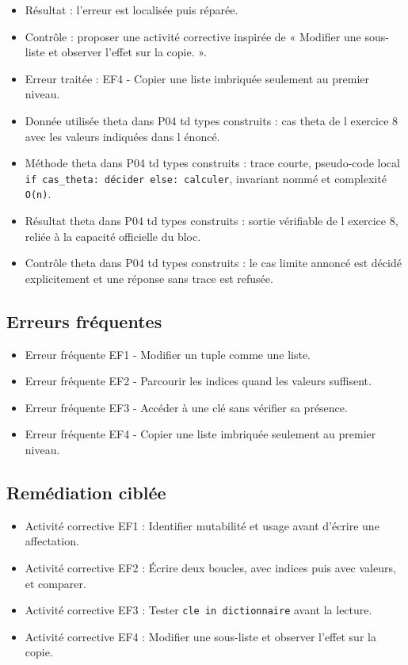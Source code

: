 \begin{itemize}
  Corrigé exercice 8
\item
  Résultat : l'erreur est localisée puis réparée.
\item
  Contrôle : proposer une activité corrective inspirée de « Modifier une
  sous-liste et observer l'effet sur la copie. ».
\item
  Erreur traitée : EF4 - Copier une liste imbriquée seulement au premier
  niveau.
\item
  Donnée utilisée theta dans P04 td types construits : cas theta de l
  exercice 8 avec les valeurs indiquées dans l énoncé.
\item
  Méthode theta dans P04 td types construits : trace courte, pseudo-code
  local \texttt{if\ cas\_theta:\ décider\ else:\ calculer}, invariant
  nommé et complexité \texttt{O(n)}.
\item
  Résultat theta dans P04 td types construits : sortie vérifiable de l
  exercice 8, reliée à la capacité officielle du bloc.
\item
  Contrôle theta dans P04 td types construits : le cas limite annoncé
  est décidé explicitement et une réponse sans trace est refusée.
\end{itemize}

\subsection{Erreurs fréquentes}

\begin{itemize}
\tightlist
\item
  Erreur fréquente EF1 - Modifier un tuple comme une liste.
\item
  Erreur fréquente EF2 - Parcourir les indices quand les valeurs
  suffisent.
\item
  Erreur fréquente EF3 - Accéder à une clé sans vérifier sa présence.
\item
  Erreur fréquente EF4 - Copier une liste imbriquée seulement au premier
  niveau.
\end{itemize}

\subsection{Remédiation ciblée}

\begin{itemize}
\tightlist
\item
  Activité corrective EF1 : Identifier mutabilité et usage avant
  d'écrire une affectation.
\item
  Activité corrective EF2 : Écrire deux boucles, avec indices puis avec
  valeurs, et comparer.
\item
  Activité corrective EF3 : Tester \texttt{cle\ in\ dictionnaire} avant
  la lecture.
\item
  Activité corrective EF4 : Modifier une sous-liste et observer l'effet
  sur la copie.
\end{itemize}

